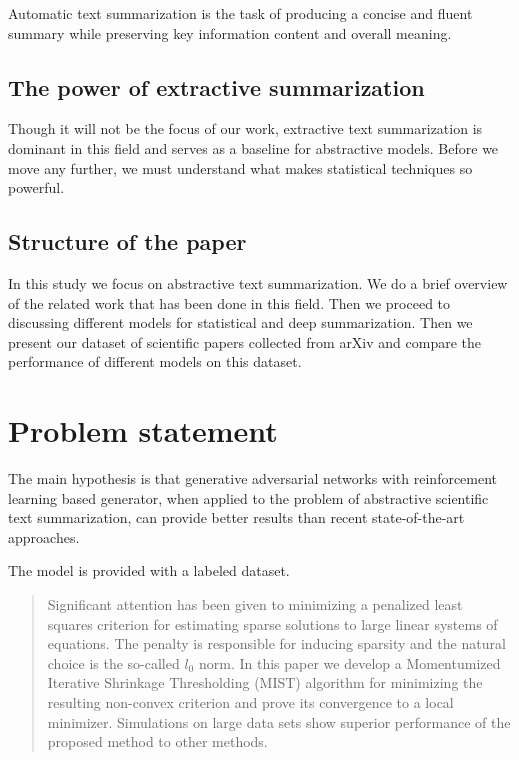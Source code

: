 \documentclass[sigplan]{acmart}
\begin{document}
Automatic text summarization is the task of producing a concise and fluent summary while preserving key information content and overall meaning\cite{allahyari-17}.

\subsection{The power of extractive summarization}

Though it will not be the focus of our work, extractive text summarization is dominant in this field and serves as a baseline for abstractive models. Before we move any further, we must understand what makes statistical techniques so powerful.

\subsection{Structure of the paper}

In this study we focus on abstractive text summarization. We do a brief overview of the related work that has been done in this field. Then we proceed to discussing different models for statistical and deep summarization. Then we present our dataset of scientific papers collected from arXiv and compare the performance of different models on this dataset.

\section{Problem statement}

The main hypothesis is that generative adversarial networks with reinforcement learning based generator, when applied to the problem of abstractive scientific text summarization, can provide better results than recent state-of-the-art approaches. 

The model is provided with a labeled dataset. 

\begin{quote}
Significant attention has been given to minimizing a penalized least squares criterion for estimating sparse solutions to large linear systems of equations. The penalty is responsible for inducing sparsity and the natural choice is the so-called $l_0$ norm. In this paper we develop a Momentumized Iterative Shrinkage Thresholding (MIST) algorithm for minimizing the resulting non-convex criterion and prove its convergence to a local minimizer. Simulations on large data sets show superior performance of the proposed method to other methods.
\end{quote}
\end{document}
